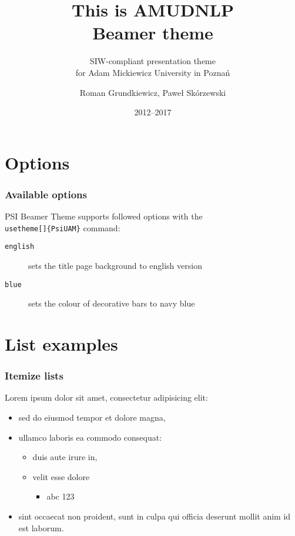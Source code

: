 \documentclass{beamer}
\title{This is AMUDNLP\\Beamer theme}
\subtitle{SIW-compliant presentation theme\\for Adam Mickiewicz University in Pozna{\'n}}
\author[{R. Grundkiewicz, P. Sk{\'o}rzewski}]{Roman Grundkiewicz, Pawe{\l} Sk{\'o}rzewski}
\date{2012--2017}
\begin{document}
\begin{frame}
	\titlepage
\end{frame}


\section{Options}

\begin{frame}
	\frametitle{Available options}
    PSI Beamer Theme supports followed options with the 
    \texttt{\\usetheme[]\{PsiUAM\}} command:
		\begin{description}
 			\item [\texttt{english}] sets the title page background to english version
 			\item [\texttt{blue}] sets the colour of decorative bars to navy blue
 		\end{description}
\end{frame}

\section{List examples}

\begin{frame}

	\frametitle{Itemize lists}
    Lorem ipsum dolor sit amet, consectetur adipisicing elit:
		\begin{itemize}
			\item sed do eiusmod tempor et dolore magna,
      \item ullamco laboris ea commodo consequat:
      \begin{itemize}
        \item duis aute irure in,
        \item velit esse dolore
        \begin{itemize}
          \item abc 123
         \end{itemize}
      \end{itemize}
      \item sint occaecat non proident, sunt in culpa qui officia 
        deserunt mollit anim id est laborum.
		\end{itemize}

\end{frame}
\end{document}
